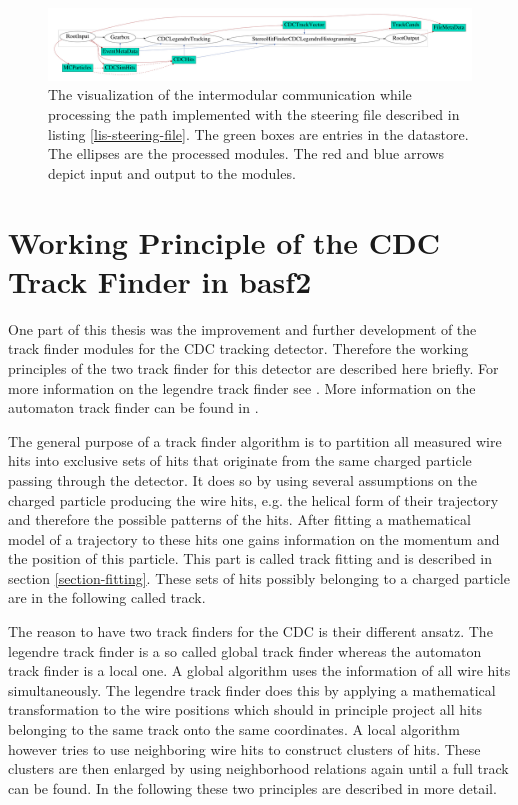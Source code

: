 \begin{figure}
 \centering
 \includegraphics[width=\linewidth]{figures/theory/dataflow.pdf}
 \caption[Visualization of intermodular communication.]{The visualization of the intermodular communication while processing the path implemented with the steering file described in listing \ref{lis-steering-file}. The green boxes are entries in the datastore. The ellipses are the processed modules. The red and blue arrows depict input and output to the modules.}
 \label{fig-viz-datastore}
\end{figure}


\section{Working Principle of the CDC Track Finder in basf2}

One part of this thesis was the improvement and further development of the track finder modules for the CDC tracking detector. Therefore the working principles of the two track finder for this detector are described here briefly. For more information on the legendre track finder see \cite{kronenbitter}. More information on the automaton track finder can be found in \cite{oliver}.

The general purpose of a track finder algorithm is to partition all measured wire hits into exclusive sets of hits that originate from the same charged particle passing through the detector. It does so by using several assumptions on the charged particle producing the wire hits, e.g. the helical form of their trajectory and therefore the possible patterns of the hits. After fitting a mathematical model of a trajectory to these hits one gains information on the momentum and the position of this particle. This part is called track fitting and is described in section \ref{section-fitting}. These sets of hits possibly belonging to a charged particle are in the following called track.

The reason to have two track finders for the CDC is their different ansatz. The legendre track finder is a so called global track finder whereas the automaton track finder is a local one. A global algorithm uses the information of all wire hits simultaneously. The legendre track finder does this by applying a mathematical transformation to the wire positions which should in principle project all hits belonging to the same track onto the same coordinates. A local algorithm however tries to use neighboring wire hits to construct clusters of hits. These clusters are then enlarged by using neighborhood relations again until a full track can be found. In the following these two principles are described in more detail.

